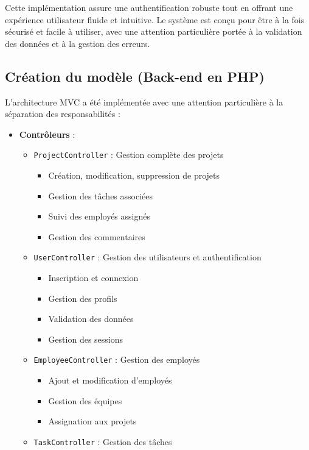 \documentclass[12pt,a4paper]{article}
\begin{document}
Cette implémentation assure une authentification robuste tout en offrant une expérience utilisateur fluide et intuitive. Le système est conçu pour être à la fois sécurisé et facile à utiliser, avec une attention particulière portée à la validation des données et à la gestion des erreurs.

\subsection{Création du modèle (Back-end en PHP)}
L'architecture MVC a été implémentée avec une attention particulière à la séparation des responsabilités :

\begin{itemize}
    \item \textbf{Contrôleurs} :
    \begin{itemize}
        \item \texttt{ProjectController} : Gestion complète des projets
        \begin{itemize}
            \item Création, modification, suppression de projets
            \item Gestion des tâches associées
            \item Suivi des employés assignés
            \item Gestion des commentaires
        \end{itemize}
        \item \texttt{UserController} : Gestion des utilisateurs et authentification
        \begin{itemize}
            \item Inscription et connexion
            \item Gestion des profils
            \item Validation des données
            \item Gestion des sessions
        \end{itemize}
        \item \texttt{EmployeeController} : Gestion des employés
        \begin{itemize}
            \item Ajout et modification d'employés
            \item Gestion des équipes
            \item Assignation aux projets
        \end{itemize}
        \item \texttt{TaskController} : Gestion des tâches

\end{itemize}
\end{itemize}
\end{document}
